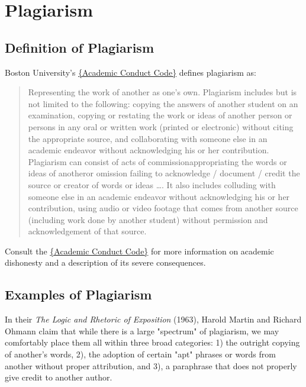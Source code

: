 

\chapter{Plagiarism}

\section{Definition of Plagiarism}

Boston University's \href{http://www.bu.edu/academics/resources/academic-conduct-code}{\{Academic Conduct Code\}}  defines plagiarism as:

\begin{quote}Representing the work of another as one's own. Plagiarism includes but is 
not limited to the following: copying the answers of another student on an examination,
 copying or restating the work or ideas of another person or persons in any oral or 
written work (printed or electronic) without citing the appropriate source, and 
collaborating with someone else in an academic endeavor without acknowledging his or 
her contribution. Plagiarism can consist of acts of commission\textemdash appropriating the words 
or ideas of another\textemdash or omission failing to acknowledge / document / credit the source 
or creator of words or ideas \dots. It also includes colluding with someone else in an 
academic endeavor without acknowledging his or her contribution, using audio or video 
footage that comes from another source (including work done by another student) 
without permission and acknowledgement of that source.
\end{quote}

Consult the \href{http://www.bu.edu/academics/resources/academic-conduct-code}{\{Academic Conduct Code\}} 
for more information on academic dishonesty and a description of its severe consequences.

\section{Examples of Plagiarism}

In their \emph{The Logic and Rhetoric of Exposition} (1963), Harold Martin and Richard
Ohmann claim that while there is a large "spectrum" of plagiarism, we may comfortably
place them all within three broad categories: 1) the outright copying of another's words, 
2), the adoption of certain "apt" phrases or words from another without proper attribution, 
and 3), a paraphrase that does not properly give credit to another author. 

